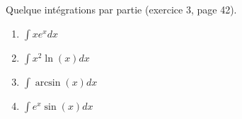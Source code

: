 \begin{exercice}\label{exoGeneral0019}

Quelque intégrations par partie (exercice 3, page 42).
\begin{enumerate}

\item
$\int xe^x dx$
\item
$\int x^2\ln(x) dx$
\item
$\int \arcsin(x) dx$
\item
$\int e^x\sin(x) dx$

\end{enumerate}

\end{exercice}
